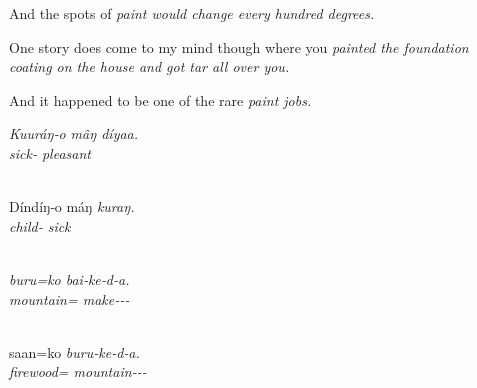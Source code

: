 \begin{exe}

  \ex\label{ex:1.1}
  \begin{xlist}

     And the spots of \em{paint} would change every hundred degrees.

     One story does come to my mind though where you \em{painted} the foundation coating on the house and got tar all over you.

     And it happened to be one of the rare \em{paint} jobs.

  \end{xlist}

  \ex\label{ex:1.2}
  \begin{xlist}

    \glll \em{Kuuráŋ}‑o      mâŋ          díyaa.\\
          \em{sick}‑  pleasant\\
          \\

    \glll Díndíŋ‑o       máŋ          \em{kuraŋ}.\\
          child‑  \em{sick}\\
          \\

  \end{xlist}

  \ex\label{ex:1.3}
  \begin{xlist}

    \glll \em{buru}=ko                bai‑ke‑d‑a.\\
          \em{mountain}= make‑‑‑\\
          \\

    \glll saan=ko                \em{buru}‑ke‑d‑a.\\
          firewood= \em{mountain‑}‑‑\\
          \\


\end{xlist}
\end{exe}
